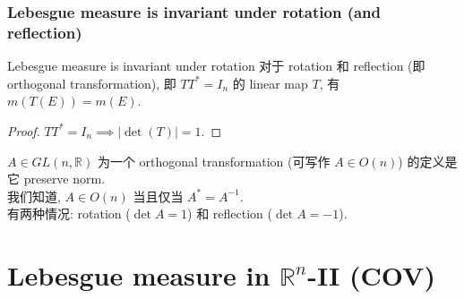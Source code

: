 \documentclass[lang=cn,11pt]{elegantbook}
\begin{document}
\subsection{Lebesgue measure is invariant under rotation (and reflection)}
\begin{corollary}{Lebesgue measure is invariant under rotation}
    对于 rotation 和 reflection (即 orthogonal transformation), 即 $TT^* = I_n$ 的 linear map $T$, 有 $m(T(E))  = m(E)$.
\end{corollary}
\begin{proof}
    $TT^* = I_n \implies |\det (T)| = 1$. 
\end{proof}
\begin{remark}
    $A \in GL(n,\mathbb{R})$ 为一个 orthogonal transformation (可写作 $A \in O(n)$) 的定义是它 preserve norm.\\
我们知道, $A \in O(n)$ 当且仅当 $A^* = A^{-1}$.\\
有两种情况: rotation ($\det A = 1$) 和 reflection ($\det A = -1$).\\
\end{remark}


\chapter{Lebesgue measure in $\mathbb{R}^n$-II (COV)}
\end{document}
